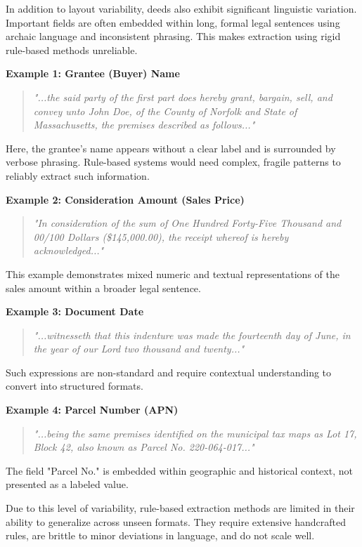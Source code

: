 \documentclass{article}
\begin{document}
In addition to layout variability, deeds also exhibit significant linguistic variation. Important fields are often embedded within long, formal legal sentences using archaic language and inconsistent phrasing. This makes extraction using rigid rule-based methods unreliable. \cite{harriscountydeeds}

\textbf{Example 1: Grantee (Buyer) Name}
\begin{quote}
\textit{"...the said party of the first part does hereby grant, bargain, sell, and convey unto John Doe, of the County of Norfolk and State of Massachusetts, the premises described as follows..."}
\end{quote}

Here, the grantee's name appears without a clear label and is surrounded by verbose phrasing. Rule-based systems would need complex, fragile patterns to reliably extract such information.

\textbf{Example 2: Consideration Amount (Sales Price)}
\begin{quote}
\textit{"In consideration of the sum of One Hundred Forty-Five Thousand and 00/100 Dollars (\$145,000.00), the receipt whereof is hereby acknowledged..."}
\end{quote}

This example demonstrates mixed numeric and textual representations of the sales amount within a broader legal sentence.

\textbf{Example 3: Document Date}
\begin{quote}
\textit{"...witnesseth that this indenture was made the fourteenth day of June, in the year of our Lord two thousand and twenty..."}
\end{quote}

Such expressions are non-standard and require contextual understanding to convert into structured formats.

\textbf{Example 4: Parcel Number (APN)}
\begin{quote}
\textit{"...being the same premises identified on the municipal tax maps as Lot 17, Block 42, also known as Parcel No. 220-064-017..."}
\end{quote}

The field "Parcel No." is embedded within geographic and historical context, not presented as a labeled value.

Due to this level of variability, rule-based extraction methods are limited in their ability to generalize across unseen formats. They require extensive handcrafted rules, are brittle to minor deviations in language, and do not scale well.
\end{document}
